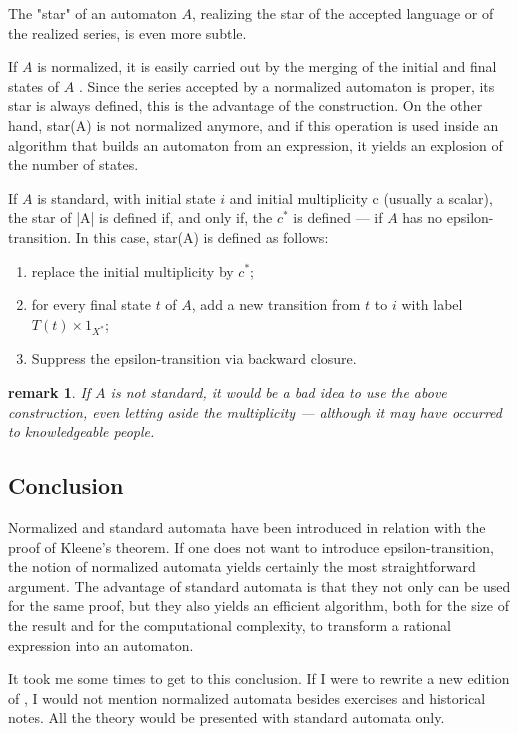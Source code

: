 \documentclass[a4paper]{report}
\newtheorem{remark}     [theorem]{remark}
\begin{document}
The "star" of an automaton $A$, realizing the star of the accepted
language or of the realized series, is even more subtle.

If $A$ is normalized, it is easily carried out by the merging of the
initial and final states of $A$ . Since the series accepted by a
normalized automaton is proper, its star is always defined, this is
the advantage of the construction. On the other hand, star(A) is not
normalized anymore, and if this operation is used inside an algorithm
that builds an automaton from an expression, it yields an explosion of
the number of states.

If $A$ is standard, with initial state $i$ and initial multiplicity c
(usually a scalar), the star of |A| is defined if, and only if, the
$c^{*}$ is defined \cite[Prop. III.2.6]{sakarovitch.03.eta} --- if $A$ has
no epsilon-transition.  In this case, star(A) is defined as follows:

\begin{enumerate}
\item replace the initial multiplicity by $c^*$;

\item for every final state $t$ of $A$, add a new transition from $t$
  to $i$ with label $T(t) \times 1_{X^*}$;

\item Suppress the epsilon-transition via backward closure.
\end{enumerate}
\begin{remark}
  If $A$ is not standard, it would be a bad idea to use the above
  construction, even letting aside the multiplicity --- although it
  may have occurred to knowledgeable people.
\end{remark}

\subsection{Conclusion}

Normalized and standard automata have been introduced in relation with
the proof of Kleene's theorem. If one does not want to introduce
epsilon-transition, the notion of normalized automata yields certainly
the most straightforward argument. The advantage of standard automata
is that they not only can be used for the same proof, but they also
yields an efficient algorithm, both for the size of the result and for
the computational complexity, to transform a rational expression into
an automaton.

It took me some times to get to this conclusion. If I were to rewrite
a new edition of \cite{sakarovitch.03.eta}, I would not mention
normalized automata besides exercises and historical notes. All the
theory would be presented with standard automata only.
\end{document}

